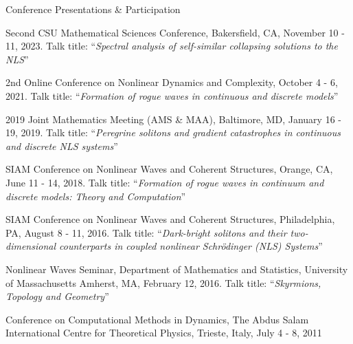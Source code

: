 \documentclass[10pt]{article} %
\begin{document}
\begin{section}{Conference Presentations \& Participation}
\begin{etaremune}
\setlength\itemsep{1em}


\item \vskip -6.2mm Second CSU Mathematical Sciences Conference, Bakersfield, CA, November 10 - 11, 2023.
Talk title: ``\textit{Spectral analysis of self-similar collapsing solutions to the NLS}''

\item  2nd Online Conference on Nonlinear Dynamics and Complexity, October 4 - 6, 2021.
Talk title: ``\textit{Formation of rogue waves in continuous and discrete models}''

\item
2019 Joint Mathematics Meeting (AMS \& MAA), Baltimore, MD, January 16 - 19, 2019.
                         Talk title: ``\textit{Peregrine solitons and gradient catastrophes in continuous
                         and discrete NLS systems}''

\item SIAM Conference on Nonlinear Waves and Coherent Structures, Orange, CA, June 11 - 14, 2018.
      Talk title: ``\textit{Formation of rogue waves in continuum and discrete models: Theory and
      Computation}''

\item  SIAM Conference on Nonlinear Waves and Coherent Structures, Philadelphia, PA, August 8 - 11, 2016.
       Talk title: ``\textit{Dark-bright solitons and their two-dimensional counterparts in coupled nonlinear
       Schr\"odinger (NLS) Systems}''

\item Nonlinear Waves Seminar, Department of Mathematics and Statistics, University of Massachusetts Amherst,
      MA, February 12, 2016.
      Talk title: ``\textit{Skyrmions, Topology and Geometry}''

\item  Conference on Computational Methods in Dynamics, The Abdus Salam International Centre for
       Theoretical Physics, Trieste, Italy, July 4 - 8, 2011


\end{etaremune}
\end{section}
\end{document}
